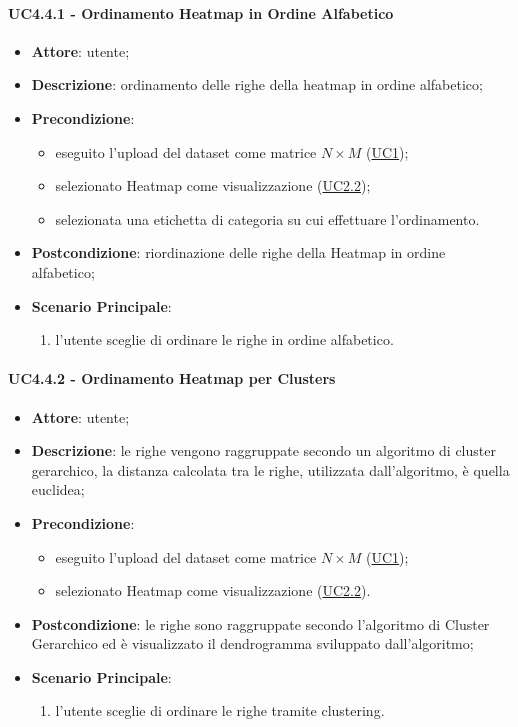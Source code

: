     \paragraph{UC4.4.1 - Ordinamento Heatmap in Ordine Alfabetico}
    \label{uc4.4.1}
    \begin{itemize}
    \item \textbf{Attore}: utente;
    \item \textbf{Descrizione}: ordinamento delle righe della heatmap in ordine alfabetico;
    \item \textbf{Precondizione}: 
    \begin{itemize}
        \item eseguito l'upload del dataset come matrice $N\times M$ (\hyperref[uc1]{UC1});
        \item selezionato Heatmap come visualizzazione (\hyperref[uc2.2]{UC2.2});
        \item selezionata una etichetta di categoria su cui effettuare l'ordinamento.
    \end{itemize}  
    \item \textbf{Postcondizione}: riordinazione delle righe della Heatmap in ordine alfabetico;
    \item \textbf{Scenario Principale}: 
    \begin{enumerate}
        \item l'utente sceglie di ordinare le righe in ordine alfabetico.
    \end{enumerate}  
    \end{itemize}
    
    \paragraph{UC4.4.2 - Ordinamento Heatmap per Clusters}
    \label{uc4.4.2}
    \begin{itemize}
    \item \textbf{Attore}: utente;
    \item \textbf{Descrizione}: le righe vengono raggruppate secondo un algoritmo di cluster gerarchico, la distanza calcolata  tra le righe, utilizzata dall'algoritmo, è quella euclidea;
    \item \textbf{Precondizione}: 
    \begin{itemize}
        \item eseguito l'upload del dataset come matrice $N\times M$ (\hyperref[uc1]{UC1});
        \item selezionato Heatmap come visualizzazione (\hyperref[uc2.2]{UC2.2}).
    \end{itemize}  
    \item \textbf{Postcondizione}: le righe sono raggruppate secondo l'algoritmo di Cluster Gerarchico ed è visualizzato il dendrogramma sviluppato dall'algoritmo;
    \item \textbf{Scenario Principale}: 
    \begin{enumerate}
        \item l'utente sceglie di ordinare le righe tramite clustering.
    \end{enumerate}  
    \end{itemize}
